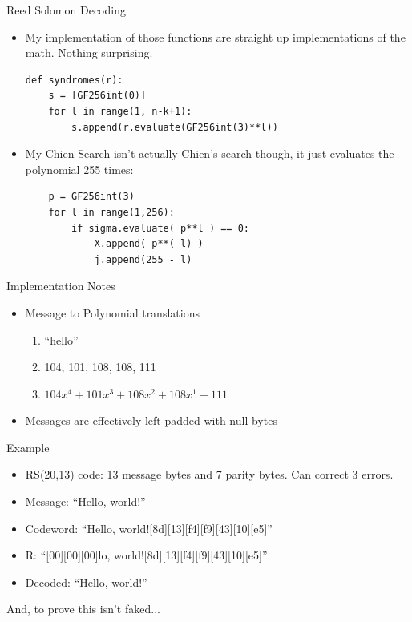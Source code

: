 \documentclass[]{prosper}
\begin{document}
\begin{slide}{Reed Solomon Decoding}
\begin{itemize}
    \item My implementation of those functions are straight up implementations of the math. Nothing surprising.
\begin{verbatim}
def syndromes(r):
    s = [GF256int(0)]
    for l in range(1, n-k+1):
        s.append(r.evaluate(GF256int(3)**l))
\end{verbatim}
    \item My Chien Search isn't actually Chien's search though, it just evaluates the polynomial 255 times:
\begin{verbatim}
    p = GF256int(3)
    for l in range(1,256):
        if sigma.evaluate( p**l ) == 0:
            X.append( p**(-l) )
            j.append(255 - l)
\end{verbatim}
\end{itemize}
\end{slide}


\begin{slide}{Implementation Notes}
\begin{itemize}
    \item Message to Polynomial translations
    \begin{enumerate}
        \item ``hello''
        \item 104, 101, 108, 108, 111
        \item $104x^4 + 101x^3 + 108x^2 + 108x^1 + 111$
    \end{enumerate}
    \item Messages are effectively left-padded with null bytes
\end{itemize}
\end{slide}

\begin{slide}{Example}
\begin{itemize}
    \item RS(20,13) code: 13 message bytes and 7 parity bytes. Can correct 3 errors.
    \item Message: ``Hello, world!''
    \item Codeword: ``Hello, world![8d][13][f4][f9][43][10][e5]''
    \item R: ``[00][00][00]lo, world![8d][13][f4][f9][43][10][e5]''
    \item Decoded: ``Hello, world!''
\end{itemize}
And, to prove this isn't faked...
\end{slide}
\end{document}
